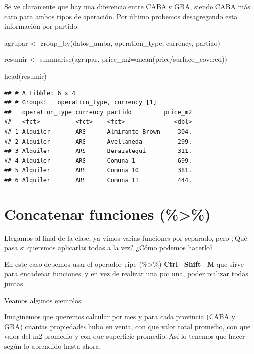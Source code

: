 \documentclass[
  spanish,
]{book}
\newenvironment{Shaded}{\begin{snugshade}}{\end{snugshade}}
\newcommand{\AttributeTok}[1]{\textcolor[rgb]{0.77,0.63,0.00}{#1}}
\newcommand{\FunctionTok}[1]{\textcolor[rgb]{0.00,0.00,0.00}{#1}}
\newcommand{\NormalTok}[1]{#1}
\newcommand{\OtherTok}[1]{\textcolor[rgb]{0.56,0.35,0.01}{#1}}
\newcommand{\SpecialCharTok}[1]{\textcolor[rgb]{0.00,0.00,0.00}{#1}}
\begin{document}
Se ve claramente que hay una diferencia entre CABA y GBA, siendo CABA más caro para ambos tipos de operación. Por último probemos desagregando esta información por partido:

\begin{Shaded}
\begin{Highlighting}[]
\NormalTok{agrupar }\OtherTok{\textless{}{-}} \FunctionTok{group\_by}\NormalTok{(datos\_amba, operation\_type, currency, partido)}

\NormalTok{resumir }\OtherTok{\textless{}{-}} \FunctionTok{summarise}\NormalTok{(agrupar, }\AttributeTok{price\_m2=}\FunctionTok{mean}\NormalTok{(price}\SpecialCharTok{/}\NormalTok{surface\_covered))}

\FunctionTok{head}\NormalTok{(resumir)}
\end{Highlighting}
\end{Shaded}

\begin{verbatim}
## # A tibble: 6 x 4
## # Groups:   operation_type, currency [1]
##   operation_type currency partido         price_m2
##   <fct>          <fct>    <fct>              <dbl>
## 1 Alquiler       ARS      Almirante Brown     304.
## 2 Alquiler       ARS      Avellaneda          299.
## 3 Alquiler       ARS      Berazategui         311.
## 4 Alquiler       ARS      Comuna 1            699.
## 5 Alquiler       ARS      Comuna 10           381.
## 6 Alquiler       ARS      Comuna 11           444.
\end{verbatim}

\hypertarget{concatenar-funciones}{%
\section{Concatenar funciones (\%\textgreater\%)}\label{concatenar-funciones}}

Llegamos al final de la clase, ya vimos varias funciones por separado, pero ¿Qué pasa si queremos aplicarlas todas a la vez? ¿Cómo podemos hacerlo?

En este caso debemos usar el operador pipe (\%\textgreater\%) \textbf{Ctrl+Shift+M} que sirve para encadenar funciones, y en vez de realizar una por una, poder realizar todas juntas.

Veamos algunos ejemplos:

Imaginemos que queremos calcular por mes y para cada provincia (CABA y GBA) cuantas propiedades hubo en venta, con que valor total promedio, con que valor del m2 promedio y con que superficie promedio. Así lo tenemos que hacer según lo aprendido hasta ahora:
\end{document}
